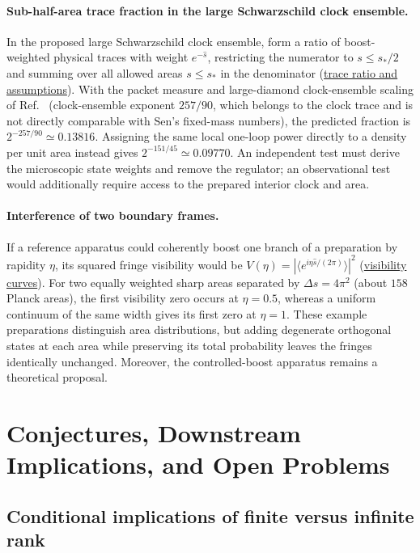 \documentclass[10pt,a4paper]{article}
\numberwithin{equation}{section}
\newcommand{\repo}[2]{\href{https://github.com/sprajs/quantum-gravity/blob/main/#1}{#2}}
\begin{document}
\paragraph{Sub-half-area trace fraction in the large Schwarzschild clock ensemble.}
In the proposed large Schwarzschild clock ensemble, form a ratio of boost-weighted physical traces with weight $e^{-\hat{s}}$, restricting the numerator to $s\le s_*/2$ and summing over all allowed areas $s\le s_*$ in the denominator (\repo{audit/observable-entropy.md}{trace ratio and assumptions}).
With the packet measure and large-diamond clock-ensemble scaling of Ref.~\cite{Chandrasekaran2026} (clock-ensemble exponent $257/90$, which belongs to the clock trace and is not directly comparable with Sen's fixed-mass numbers), the predicted fraction is $2^{-257/90}\simeq 0.13816$.
Assigning the same local one-loop power directly to a density per unit area instead gives $2^{-151/45}\simeq 0.09770$.
An independent test must derive the microscopic state weights and remove the regulator; an observational test would additionally require access to the prepared interior clock and area.

\paragraph{Interference of two boundary frames.}
If a reference apparatus could coherently boost one branch of a preparation by rapidity $\eta$, its squared fringe visibility would be $V(\eta)=|\langle e^{i\eta\hat{s}/(2\pi)}\rangle|^2$ (\repo{audit/observable-visibility.md}{visibility curves}).
For two equally weighted sharp areas separated by $\Delta s = 4\pi^2$ (about $158$ Planck areas), the first visibility zero occurs at $\eta=0.5$, whereas a uniform continuum of the same width gives its first zero at $\eta=1$.
These example preparations distinguish area distributions, but adding degenerate orthogonal states at each area while preserving its total probability leaves the fringes identically unchanged.
Moreover, the controlled-boost apparatus remains a theoretical proposal.

\section{Conjectures, Downstream Implications, and Open Problems}
\label{sec:open}

\subsection{Conditional implications of finite versus infinite rank}
\end{document}
